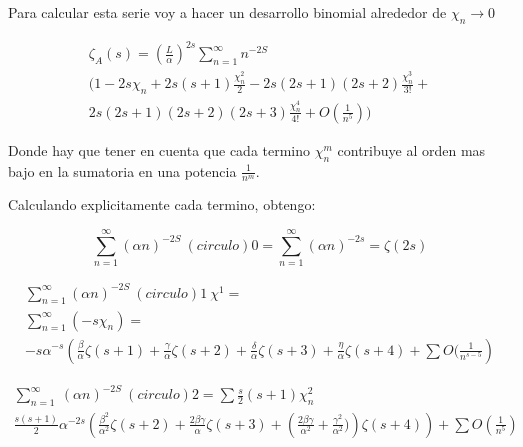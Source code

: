 Para calcular esta serie voy a hacer un desarrollo binomial alrededor de $\chi _n \rightarrow{0} $ 

\begin{equation}
\begin{array}{c}
\zeta _{A} (s) = 
( \frac{L}{\alpha} ) ^{2s}
\sum _{n=1} ^{\infty}
  n  ^{-2 S} \\
(
1 - 2 s \chi _n + 2 s(s+1) \frac{\chi _n ^2}{2} - 2s(2s+1)(2s+2) \frac{ \chi _n ^3}{3!}  + \\ 
2s(2s+1)(2s+2)(2s+3) \frac{\chi ^4 _n}{4!}
+ O( \frac{1}{n ^5}) )

\end{array}
\end{equation}

Donde hay que tener en cuenta que cada termino $\chi _{n} ^{m} $ contribuye al orden mas bajo en la sumatoria en una potencia $\frac{1}{n ^m}$.


Calculando explicitamente cada termino, obtengo:


\begin{equation}
\sum _{n=1} ^{\infty}
( \alpha n ) ^{-2 S} \ 
(circulo){0} = \sum _{n=1} ^{\infty} (\alpha n )^ {-2 s} = \zeta (2 s)
\end{equation}

\begin{equation}
\begin{array}{cc}
    \sum _{n=1} ^{\infty}
    ( \alpha n )   ^{-2 S} \ 
    (circulo){1} \ \chi ^1 = \\ 
    \sum _{n=1} ^{\infty} (-s \chi _n) = \\
    -s \alpha ^{-s} \left(
    \frac{\beta}{\alpha} \zeta(s+1) +
    \frac{\gamma}{\alpha} \zeta (s+2) + 
    \frac{\delta}{\alpha} \zeta (s+3) + 
    \frac{\eta}{\alpha} \zeta (s+4) + 
    \sum O (\frac{1}{n ^{s-5}}
    \right)
\end{array}
\end{equation}

\begin{equation}
\begin{array}{cc}
    \sum _{n=1} ^{\infty} \
    ( \alpha n ) ^{-2 S} \
    (circulo){2} = \sum \frac{s}{2} (s+1) \chi _n ^2 \\
    \frac{s(s+1)}{2} \alpha ^{-2s} \left(
    \frac{\beta ^2}{\alpha ^2} \zeta (s+2) +
    \frac{2 \beta \gamma}{\alpha} \zeta (s+3) + 
    \left(\frac{2 \beta \gamma}{\alpha ^2} + \frac{\gamma ^2}{\alpha ^2} ) \right)
    \zeta (s+4)
    \right ) + 
    \sum O(\frac{1}{n ^5 } )
\end{array}
\end{equation}

